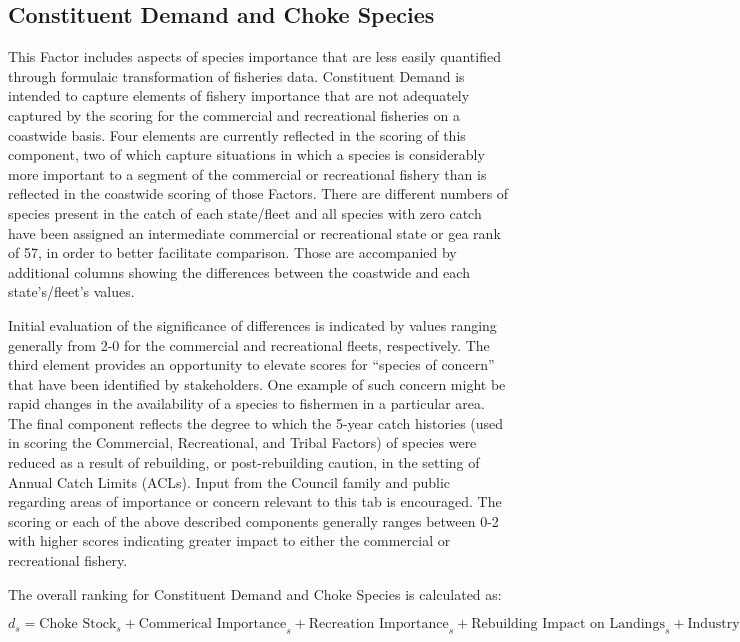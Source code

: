 \documentclass[12pt,]{article}
\begin{document}
\FloatBarrier

\subsection{Constituent Demand and Choke
Species}\label{constituent-demand-and-choke-species}

This Factor includes aspects of species importance that are less easily
quantified through formulaic transformation of fisheries data.
Constituent Demand is intended to capture elements of fishery importance
that are not adequately captured by the scoring for the commercial and
recreational fisheries on a coastwide basis. Four elements are currently
reflected in the scoring of this component, two of which capture
situations in which a species is considerably more important to a
segment of the commercial or recreational fishery than is reflected in
the coastwide scoring of those Factors. There are different numbers of
species present in the catch of each state/fleet and all species with
zero catch have been assigned an intermediate commercial or recreational
state or gea rank of 57, in order to better facilitate comparison. Those
are accompanied by additional columns showing the differences between
the coastwide and each state's/fleet's values.

Initial evaluation of the significance of differences is indicated by
values ranging generally from 2-0 for the commercial and recreational
fleets, respectively. The third element provides an opportunity to
elevate scores for ``species of concern'' that have been identified by
stakeholders. One example of such concern might be rapid changes in the
availability of a species to fishermen in a particular area. The final
component reflects the degree to which the 5-year catch histories (used
in scoring the Commercial, Recreational, and Tribal Factors) of species
were reduced as a result of rebuilding, or post-rebuilding caution, in
the setting of Annual Catch Limits (ACLs). Input from the Council family
and public regarding areas of importance or concern relevant to this tab
is encouraged. The scoring or each of the above described components
generally ranges between 0-2 with higher scores indicating greater
impact to either the commercial or recreational fishery.

The overall ranking for Constituent Demand and Choke Species is
calculated as:

\begin{centering}

$d_s = \text{Choke Stock}_s + \text{Commerical Importance}_s + \text{Recreation Importance}_s + \text{Rebuilding Impact on Landings}_s + \text{Industry Concern}_s$

\end{centering}
\end{document}
